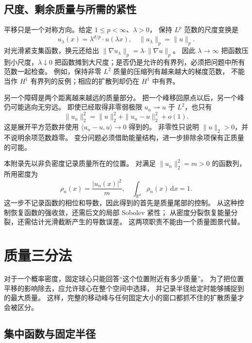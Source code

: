 \subsection{尺度、剩余质量与所需的紧性}
\label{b2:subsec:F0102}

平移只是一个对称方向。给定 \(1\le p<\infty\)、\(\lambda>0\)，
保持 \(L^p\) 范数的尺度变换是
\[
 u_\lambda(x)=\lambda^{d/p}\cdot u(\lambda x),
 \quad \|u_\lambda\|_p=\|u\|_p.
\]
对光滑紧支集函数，换元还给出
\(\|\nabla u_\lambda\|_p=\lambda\cdot\|\nabla u\|_p\)。
因此 \(\lambda\to\infty\) 把函数压到小尺度，\(\lambda\downarrow0\)
把函数摊到大尺度；是否仍是允许的有界列，必须把问题中所有范数一起检查。
例如，保持非零 \(L^2\) 质量的压缩列有越来越大的梯度范数，
不能当作 \(H^1\) 有界列的反例；相应的扩散列却仍在 \(H^1\) 中有界。

\ProseParagraphBreak
另一个障碍是两个距离越来越远的质量部分。
把一个峰移回原点以后，另一个峰仍可能逃向无穷远。
即使已经取得非零弱极限 \(u_n\rightharpoonup u\) 于 \(L^2\)，也只有
\[
 \|u_n\|_2^2
 =\|u\|_2^2+\|u_n-u\|_2^2+o(1).
\]
这是展开平方范数并使用
\(\langle u_n-u,u\rangle\to0\) 得到的。
非零性只说明 \(\|u\|_2>0\)，并不说明余项范数趋零。
变分问题必须借助能量结构，进一步排除余项保有正质量的可能。

\ProseParagraphBreak
本附录先以非负密度记录质量所在的位置。
对满足 \(\|u_n\|_2^2=m>0\) 的函数列，所用密度为
\[
 \rho_n(x)=\frac{|u_n(x)|^2}{m},
 \quad \int_{\mathbb R^d}\rho_n(x)\,\mathrm dx=1.
\]
这一步不记录函数的相位和导数，因此得到的首先是质量尾部的控制。
从这种控制恢复函数的强收敛，还需后文的局部 Sobolev 紧性；
从密度分裂恢复能量分裂，还需估计光滑截断产生的导数误差。
这两项职责不能由一个质量图景代替。

\section{质量三分法}
\label{b2:sec:app-F-2}

对于一个概率密度，固定球心只能回答“这个位置附近有多少质量”。
为了把位置平移的影响除去，应允许球心在整个空间中选择，
并记录半径给定时能够捕捉到的最大质量。
这样，完整的移动峰与任何固定大小的窗口都抓不住的扩散质量才会被区分。

\subsection{集中函数与固定半径}
\label{b2:subsec:F0201}

